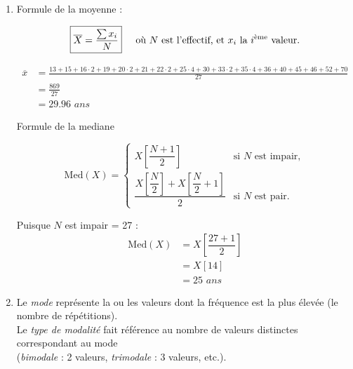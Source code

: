 \documentclass{article}
\begin{document}
\begin{enumerate}
    \item Formule de la moyenne :

    \[
        \boxed{\overline{X} = \frac{\sum x_i}{N}} \hspace{0.5cm}
    \text{où } N \text{ est l’effectif, et } x_i \text{ la } i^{\text{ème}} \text{ valeur.}
    \]
    
    \begin{align*}
        \overline{x} &= \frac{13+15+16\cdot2+19+20\cdot2+21+22\cdot2+25\cdot4+30+33\cdot2+35\cdot4+36+40+45+46+52+70}{27}\\ 
                     &= \frac{869}{27}\\
                     &= \boxed { 29.96 \textit{ ans}}
    \end{align*}

    \vspace{0.15cm}

    Formule de la mediane 
    
\[
    \text{Med}(X) =
    \begin{cases}
        X\!\left[\dfrac{N+1}{2}\right] & \text{si } N \text{ est impair}, \\[0.5cm]
        \dfrac{X\!\left[\dfrac{N}{2}\right] + X\!\left[\dfrac{N}{2} + 1\right]}{2} & \text{si } N \text{ est pair.}
    \end{cases}
    \]

    \vspace{0.15cm}

    Puisque \(N\) est impair = 27 :
    \begin{align*}
        \text{Med}(X) &= X\!\left[\dfrac{27+1}{2}\right]\\
                      &= X\![14]\\
                      &=\boxed{25\textit{ ans}}
    \end{align*}

    \newpage

\item Le \textit{mode} représente la ou les valeurs dont la fréquence est la plus élevée (le nombre de répétitions).\\[0.1cm]
Le \textit{type de modalité} fait référence au nombre de valeurs distinctes correspondant au mode \\(\textit{bimodale} : 2 valeurs, \textit{trimodale} : 3 valeurs, etc.).


\end{enumerate}
\end{document}
